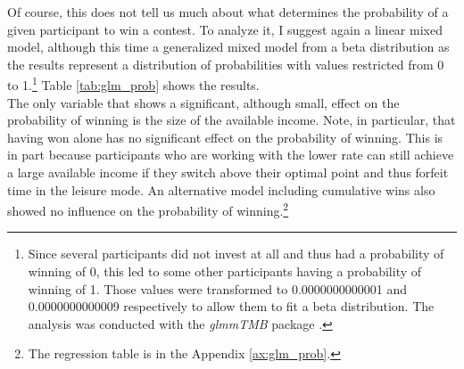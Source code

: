 Of course, this does not tell us much about what determines the probability of a given participant to win a contest. To analyze it, I suggest again a linear mixed model, although this time a generalized mixed model from a beta distribution as the results represent a distribution of probabilities with values restricted from 0 to 1\citep[Chapter~17]{krishnamoorthy2016}.\footnote{Since several participants did not invest at all and thus had a probability of winning of 0, this led to some other participants having a probability of winning of 1. Those values were transformed to 0.0000000000001 and 0.0000000000009 respectively to allow them to fit a beta distribution. The analysis was conducted with the \textit{glmmTMB} package \citep{brooks2017}.} Table \ref{tab:glm_prob} shows the results.\\

The only variable that shows a significant, although small, effect on the probability of winning is the size of the available income. Note, in particular, that having won alone has no significant effect on the probability of winning. This is in part because participants who are working with the lower rate can still achieve a large available income if they switch above their optimal point and thus forfeit time in the leisure mode. An alternative model including cumulative wins also showed no influence on the probability of winning.\footnote{The regression table is in the Appendix \ref{ax:glm_prob}.}\\

